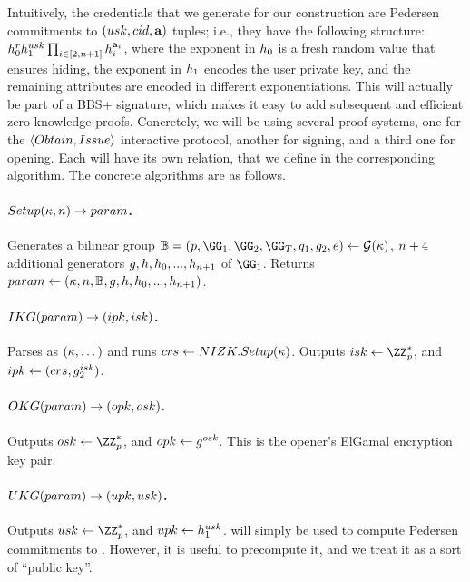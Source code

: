 Intuitively, the credentials that we generate for our \GSAC construction are
Pedersen commitments to $(usk,cid,\mathbf{a})$ tuples; i.e., they have
the following structure: $h_0^rh_1^{usk}\prod_{i \in [2,n+1]}
h_i^{\mathbf{a}_i}$, where the exponent in $h_0$ is a fresh random value
that ensures hiding, the exponent in $h_1$ encodes the user private
key, and the remaining attributes are encoded in different
exponentiations. This will actually be part of a BBS+ signature, which makes it
easy to add subsequent and efficient zero-knowledge proofs. Concretely, we will
be using several \NIZK proof systems, one for the $\langle Obtain,Issue
\rangle$ interactive protocol, another for signing, and a third one for opening.
Each will have its own relation, that we define in the corresponding algorithm.
The concrete algorithms are as follows.

\paragraph{$Setup(\kappa,n) \rightarrow param$.} %
Generates a bilinear group $\BB = (p,\GG_1,\GG_2,\GG_T,\gen{g}_1,\gen{g}_2,e) \gets
\PGen(\secpar)$, $n+4$ additional generators $g,h,h_0,...,
h_{n+1}$ of $\GG_1$. Returns $param \gets
(\kappa,n,\mathbb{B},g,h,h_0,...,h_{n+1})$.

\paragraph{$IKG(param) \rightarrow (ipk,isk)$.} %
Parses \parm as $(\kappa,\dots)$ and runs $crs \gets NIZK.Setup(\kappa)$.
Outputs $\isk \gets \ZZ^*_p$, and $ipk \gets (crs,g_2^{isk})$.

\paragraph{$OKG(param) \rightarrow (opk,osk)$.} %
Outputs $\osk \gets \ZZ^*_p$, and $opk \gets g^{osk}$. This is the
opener's ElGamal encryption key pair.

\paragraph{$UKG(param) \rightarrow (upk,usk)$.} %
Outputs $\usk \gets \ZZ^*_p$, and $upk \gets h_1^{usk}$. \upk will
simply be used to compute Pedersen commitments to \usk. However,
it is useful to precompute it, and we treat it as a sort of ``public key''.

